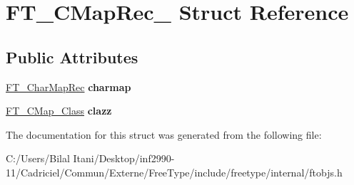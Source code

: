 \hypertarget{struct_f_t___c_map_rec__}{}\section{F\+T\+\_\+\+C\+Map\+Rec\+\_\+ Struct Reference}
\label{struct_f_t___c_map_rec__}
\subsection*{Public Attributes}
\begin{DoxyCompactItemize}
\item 
\hyperlink{struct_f_t___char_map_rec__}{F\+T\+\_\+\+Char\+Map\+Rec} {\bfseries charmap}\hypertarget{struct_f_t___c_map_rec___a39fa6de9995d4ae4496b93e2b874b34e}{}\label{struct_f_t___c_map_rec___a39fa6de9995d4ae4496b93e2b874b34e}

\item 
\hyperlink{struct_f_t___c_map___class_rec__}{F\+T\+\_\+\+C\+Map\+\_\+\+Class} {\bfseries clazz}\hypertarget{struct_f_t___c_map_rec___aa85db42650df0edb38f8af5887c0ac6a}{}\label{struct_f_t___c_map_rec___aa85db42650df0edb38f8af5887c0ac6a}

\end{DoxyCompactItemize}


The documentation for this struct was generated from the following file\+:\begin{DoxyCompactItemize}
\item 
C\+:/\+Users/\+Bilal Itani/\+Desktop/inf2990-\/11/\+Cadriciel/\+Commun/\+Externe/\+Free\+Type/include/freetype/internal/ftobjs.\+h\end{DoxyCompactItemize}
